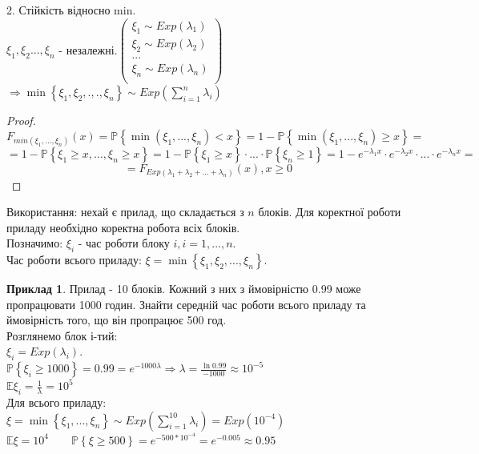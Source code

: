 \documentclass[fontsize=14pt,a4paper]{scrartcl}
\theoremstyle{definition}
\newtheorem*{example}{Приклад}
\theoremstyle{remark}
\theoremstyle{definition}
\theoremstyle{definition}
\begin{document}
2. Стійкість відносно min.\\
$ \xi_1, \xi_2 ... , \xi_n$ - незалежні.$ \left(  \begin{gathered}
\xi_1 \sim Exp(\lambda_1) \\
 \xi_2 \sim Exp(\lambda_2) \\
 ...\\
 \xi_n \sim Exp(\lambda_n) \\
\end{gathered} \right) $  $ \Rightarrow \min \left\lbrace  \xi_1 , \xi_2, .,. , \xi_n \right\rbrace  \sim Exp (  \sum\limits_{i = 1}^{ n}{ \lambda_i})$
\begin{proof}

$$
F_{min(\xi_1, ..., \xi_n)} (x) = \mathbb{P} \left\lbrace \min \left(\xi_1, ... , \xi_n  \right) < x  \right\rbrace  = 1 - \mathbb{P} \left\lbrace \min \left(\xi_1, ... , \xi_n  \right) \geq  x  \right\rbrace =
$$
$$
=\! 1 - \mathbb{P} \left\lbrace  \xi_1 \!\geq\! x, ... , \xi_n \!\geq\! x \right\rbrace \!=\! 1 - \mathbb{P} \left\lbrace \xi_1 \!\geq\!  x \right\rbrace \cdot ... \cdot \mathbb{P} \left\lbrace   \xi_n \!\geq\! 1\right\rbrace \!=\! 1 - e ^ { - \lambda_1 x} \cdot e^ { -\lambda_2 x} \cdot ... \cdot e^{- \lambda_n x} \!=
$$
$$
 = F_{Exp(\lambda_1 + \lambda_2 + ... + \lambda_n)} (x), x\geq 0
$$

\end{proof}
Використання: нехай є прилад, що складається з $n$ блоків. Для коректної роботи приладу необхідно коректна робота всіх блоків. \\
Позначимо: $\xi_i$ - час роботи блоку $i, i = 1, ..., n$.\\
Час роботи всього приладу: $ \xi = \min \left\lbrace \xi_1, \xi_2, ..., \xi_n \right\rbrace $.
\begin{example}
	Прилад - 10 блоків. Кожний з них з ймовірністю 0.99 може пропрацювати 1000 годин. Знайти середній час роботи всього приладу та ймовірність того, що він пропрацює 500 год.\\
	Розглянемо блок і-тий: \\$ \xi_i = Exp(\lambda_i)$.\\
	$\mathbb{P} \left\lbrace \xi_i \geq 1000 \right\rbrace = 0.99 = e ^ {-1000 \lambda} \Longrightarrow \lambda = \frac{ \ln{0.99}}{-1000} \approx 10^{-5}$\\
	$\mathbb{E} \xi_i = \frac{1}{\lambda} = 10^5 $\\
	Для всього приладу:\\
	$ \xi = \min \left\lbrace \xi_1, ... , \xi_n \right\rbrace  \sim Exp( \sum\limits_{i = 1}^{ 10}{\lambda_i}) = Exp(10^{-4})$\\
	$ \mathbb{E}\xi = 10^4 \qquad \mathbb{P} \left\lbrace \xi \geq 500 \right\rbrace = e^{-500 * 10^{-4}} = e^{-0.005} \approx 0.95$
\end{example}
\end{document}
